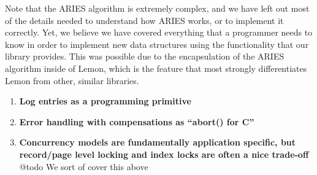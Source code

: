 \documentclass[letterpaper,twocolumn,english]{article}
\newcommand{\yad}{Lemon\xspace}
\begin{document}
Note that the ARIES algorithm is extremely complex, and we have left
out most of the details needed to understand how ARIES works, or to 
implement it correctly.
Yet, we believe we have covered everything that a programmer needs
 to know in order to implement new data structures using the 
functionality that our library provides. This was possible due to the encapsulation
of the ARIES algorithm inside of \yad, which is the feature that
most strongly differentiates \yad from other, similar libraries.




\begin{enumerate}

  \item {\bf Log entries as a programming primitive }


  \item {\bf Error handling with compensations as {}``abort() for C''}


  \item {\bf Concurrency models are fundamentally application specific, but
  record/page level locking and index locks are often a nice trade-off}  @todo We sort of cover this above

%

    



\end{enumerate}
\end{document}
